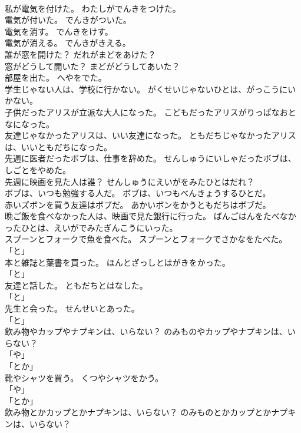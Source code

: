 \documentclass[8pt]{extreport}
\begin{document}
\begin{CJK}{UTF8}{min}
\\	私が電気を付けた。	わたしがでんきをつけた。	
\\	電気が付いた。	でんきがついた。	
\\	電気を消す。	でんきをけす。	
\\	電気が消える。	でんきがきえる。	
\\	誰が窓を開けた？	だれがまどをあけた？	
\\	窓がどうして開いた？	まどがどうしてあいた？	
\\	部屋を出た。	へやをでた。	
\\	学生じゃない人は、学校に行かない。	がくせいじゃないひとは、がっこうにいかない。	
\\	子供だったアリスが立派な大人になった。	こどもだったアリスがりっぱなおとなになった。	
\\	友達じゃなかったアリスは、いい友達になった。	ともだちじゃなかったアリスは、いいともだちになった。	
\\	先週に医者だったボブは、仕事を辞めた。	せんしゅうにいしゃだったボブは、しごとをやめた。	
\\	先週に映画を見た人は誰？	せんしゅうにえいがをみたひとはだれ？	
\\	ボブは、いつも勉強する人だ。	ボブは、いつもべんきょうするひとだ。	
\\	赤いズボンを買う友達はボブだ。	あかいボンをかうともだちはボブだ。	
\\	晩ご飯を食べなかった人は、映画で見た銀行に行った。	ばんごはんをたべなかったひとは、えいがでみたぎんこうにいった。	
\\	スプーンとフォークで魚を食べた。	スプーンとフォークでさかなをたべた。	
\\	「と」 
\\	本と雑誌と葉書を買った。	ほんとざっしとはがきをかった。	
\\	「と」 
\\	友達と話した。	ともだちとはなした。	
\\	「と」 
\\	先生と会った。	せんせいとあった。	
\\	「と」 
\\	飲み物やカップやナプキンは、いらない？	のみものやカップやナプキンは、いらない？	
\\	「や」 
\\	「とか」 
\\	靴やシャツを買う。	くつやシャツをかう。	
\\	「や」 
\\	「とか」 
\\	飲み物とかカップとかナプキンは、いらない？	のみものとかカップとかナプキンは、いらない？	

\end{CJK}
\end{document}
